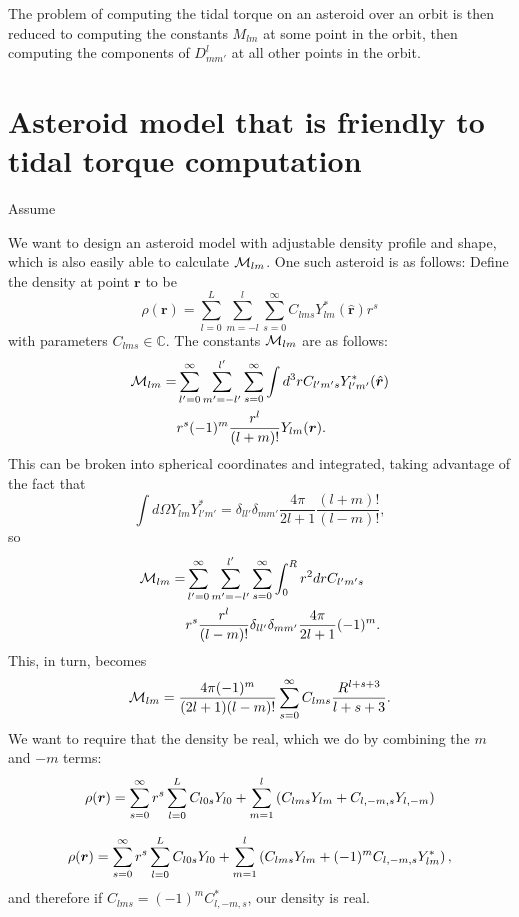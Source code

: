 \documentclass[aps,twocolumn,secnumarabic,balancelastpage,amsmath,amssymb,nofootinbib,floatfix]{revtex4-1}
\begin{document}
The problem of computing the tidal torque on an asteroid over an orbit is then reduced to computing the constants $M_{lm}$ at some point in the orbit, then computing the components of $D^l_{mm'}$ at all other points in the orbit.

\section{Asteroid model that is friendly to tidal torque computation}
Assume

We want to design an asteroid model with adjustable density profile and shape, which is also easily able to calculate $\mathcal{M}_{lm}$. One such asteroid is as follows:
Define the density at point $\bm r$ to be
$$\rho(\bm r) = \sum_{l=0}^L \sum_{m=-l}^l \sum_{s=0}^\infty C_{lms}Y^*_{lm}(\hat{\bm r})r^s$$
with parameters $C_{lms} \in \mathbb{C}$. The constants $\mathcal{M}_{lm}$ are as follows:
\begin{equation*}
\begin{aligned}\mathcal{M}_{lm} = &\sum_{l'=0}^\infty \sum_{m'=-l'}^{l'} \sum_{s=0}^\infty\int d^3 r  C_{l'm's}Y^*_{l'm'}(\hat{\bm r})\\
&r^s (-1)^m \frac{r^l}{(l+m)!}Y_{lm}(\bm r).
\end{aligned}
\end{equation*}
This can be broken into spherical coordinates and integrated, taking advantage of the fact that
$$\int d\Omega Y_{lm}Y^*_{l'm'}=\delta_{ll'}\delta_{mm'}\frac{4\pi}{2l+1}\frac{(l+m)!}{(l-m)!},$$
so
\begin{equation*}
\begin{aligned}\mathcal{M}_{lm} = &\sum_{l'=0}^\infty \sum_{m'=-l'}^{l'} \sum_{s=0}^\infty\int_0^R r^2 dr  C_{l'm's}\\
&r^s \frac{r^l}{(l-m)!}\delta_{ll'}\delta_{mm'}\frac{4\pi}{2l+1}(-1)^m.
\end{aligned}
\end{equation*}
This, in turn, becomes
$$\mathcal{M}_{lm} = \frac{4\pi (-1)^m}{(2l+1)(l-m)!}\sum_{s=0}^\infty C_{lms} \frac{R^{l+s+3}}{l+s+3}.$$
We want to require that the density be real, which we do by combining the $m$ and $-m$ terms:
$$\rho(\bm r) =  \sum_{s=0}^\infty r^s\sum_{l=0}^L C_{l0s}Y_{l0} + \sum_{m=1}^l \left( C_{lms}Y_{lm} + C_{l,-m,s}Y_{l,-m} \right)$$

$$\rho(\bm r) =  \sum_{s=0}^\infty r^s\sum_{l=0}^L C_{l0s}Y_{l0} + \sum_{m=1}^l \left( C_{lms}Y_{lm} + (-1)^m C_{l,-m,s}Y^*_{lm} \right),$$
and therefore if $C_{lms} = (-1)^m C_{l,-m,s}^*$, our density is real.
\end{document}
